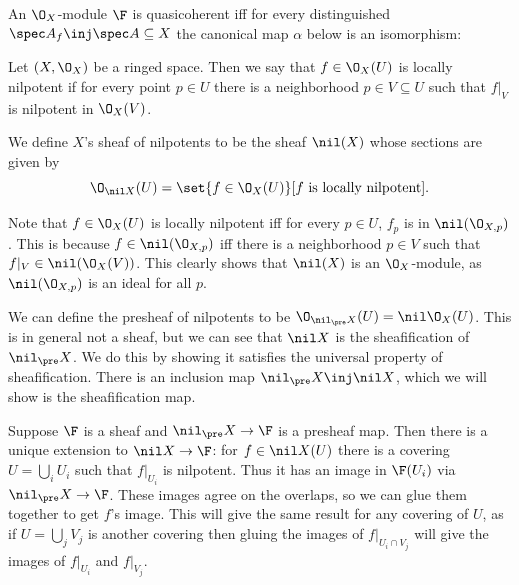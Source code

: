 \blemm[name={distinguishedquasicoherent}]

    An $\O_X$-module $\F$ is quasicoherent iff for every distinguished $\spec A_f\inj\spec A\subseteq X$ the canonical map $\alpha$ below is an isomorphism:


\elemm

\bdefn

    Let $(X,\O_X)$ be a ringed space.
    Then we say that $f\in\O_X(U)$ is {\emphcolor locally nilpotent} if for every point $p\in U$ there is a neighborhood $p\in V\subseteq U$ such that $f|_V$ is nilpotent
    in $\O_X(V)$.

    We define $X$'s {\emphcolor sheaf of nilpotents} to be the sheaf $\nil(X)$ whose sections are given by
    $$ \O_{\nil X}(U) = \set{f\in\O_X(U)}[\hbox{$f$ is locally nilpotent}] . $$

\edefn

Note that $f\in\O_X(U)$ is locally nilpotent iff for every $p\in U$, $f_p$ is in $\nil(\O_{X,p})$.
This is because $f\in\nil(\O_{X,p})$ iff there is a neighborhood $p\in V$ such that $f|_V\in\nil(\O_X(V))$.
This clearly shows that $\nil(X)$ is an $\O_X$-module, as $\nil(\O_{X,p})$ is an ideal for all $p$.

We can define the {\emphcolor presheaf of nilpotents} to be $\O_{\nil_\pre X}(U)=\nil\O_X(U)$.
This is in general not a sheaf, but we can see that $\nil X$ is the sheafification of $\nil_\pre X$.
We do this by showing it satisfies the universal property of sheafification.
There is an inclusion map $\nil_\pre X\inj\nil X$, which we will show is the sheafification map.

Suppose $\F$ is a sheaf and $\nil_\pre X\to\F$ is a presheaf map.
Then there is a unique extension to $\nil X\to\F$: for $f\in\nil X(U)$ there is a covering $U=\bigcup_iU_i$ such that $f|_{U_i}$ is nilpotent.
Thus it has an image in $\F(U_i)$ via $\nil_\pre X\to\F$.
These images agree on the overlaps, so we can glue them together to get $f$'s image.
This will give the same result for any covering of $U$, as if $U=\bigcup_jV_j$ is another covering then gluing the images of $f|_{U_i\cap V_j}$ will give the images of $f|_{U_i}$ and
$f|_{V_j}$.

